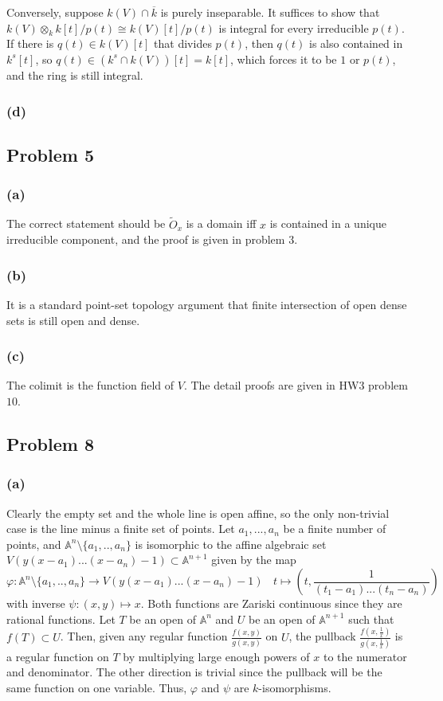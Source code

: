 \documentclass{article}
\theoremstyle{definition}
\theoremstyle{definition}
\theoremstyle{definition}
\theoremstyle{definition}
\theoremstyle{definition}
\theoremstyle{definition}
\theoremstyle{definition}
\begin{document}
Conversely, suppose $k(V)\cap \overline{k}$ is purely inseparable. It suffices to show that $k(V)\otimes_k k[t]/p(t)\cong  k(V)[t]/p(t)$ is integral for every irreducible $p(t)$. If there is $q(t)\in k(V)[t]$ that divides $p(t)$, then $q(t)$ is also contained in $k^s[t]$, so $q(t)\in (k^s\cap k(V))[t]=k[t]$,  which forces it to be $1$ or $p(t)$, and the ring is still integral. 

\subsubsection*{(d)}

\subsection*{Problem 5}
\subsubsection*{(a)}
The correct statement should be $\tilde{O}_x$ is a domain iff $x$ is contained in a unique irreducible component, and the proof is given in problem $3$.
\subsubsection*{(b)}
It is a standard point-set topology argument that finite intersection of open dense sets is still open and dense.

\subsubsection*{(c)}
The colimit is the function field of $V$. The detail proofs are given in HW3 problem $10$.

\subsection*{Problem 8}
\subsubsection*{(a)}
Clearly the empty set and the whole line is open affine, so the only non-trivial case is the line minus a finite set of points. Let $a_1,...,a_n$ be a finite number of points, and $\mathbb{A}^n\setminus \{a_1,..,a_n\}$ is isomorphic to the affine algebraic set $V(y(x-a_1)...(x-a_n)-1)\subset \mathbb{A}^{n+1}$ given by the map 
\[\varphi: \mathbb{A}^n\setminus \{a_1,..,a_n\}\to V(y(x-a_1)...(x-a_n)-1) \ \ \ \ t\mapsto (t,\frac{1}{(t_1-a_1)...(t_n-a_n)})\]
with inverse $\psi: (x,y)\mapsto x$. Both functions are Zariski continuous since they are rational functions. Let $T$ be an open of $\mathbb{A}^n$ and $U$ be an open of $\mathbb{A}^{n+1}$ such that $f(T)\subset U$. Then, given any regular function $\frac{f(x,y)}{g(x,y)}$ on $U$, the pullback $\frac{f(x,\frac{1}{x})}{g(x,\frac{1}{x})}$ is a regular function on $T$ by multiplying large enough powers of $x$ to the numerator and denominator. The other direction is trivial since the pullback will be the same function on one variable. Thus, $\varphi$ and $\psi$ are $k$-isomorphisms. 
\end{document}
